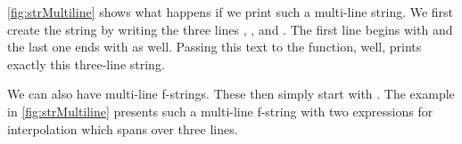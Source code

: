 \cref{fig:strMultiline} shows what happens if we print such a multi-line string.
We first create the string by writing the three lines , , and .
The first line begins with \pythonIdx{\textquotedbl\textquotedbl\textquotedbl} and the last one ends with \pythonIdx{\textquotedbl\textquotedbl\textquotedbl} as well.
Passing this text to the  function, well, prints exactly this three-line string.

We can also have multi-line f-strings.
These then simply start with .
The example in \cref{fig:strMultiline} presents such a multi-line f-string with two expressions for interpolation which spans over three lines.%
\endhsection%
%
\endhsection%
%
